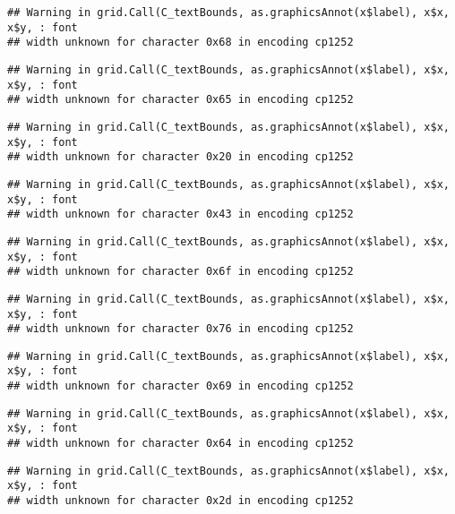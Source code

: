 \documentclass[
]{article}
\begin{document}
\begin{verbatim}
## Warning in grid.Call(C_textBounds, as.graphicsAnnot(x$label), x$x, x$y, : font
## width unknown for character 0x68 in encoding cp1252
\end{verbatim}

\begin{verbatim}
## Warning in grid.Call(C_textBounds, as.graphicsAnnot(x$label), x$x, x$y, : font
## width unknown for character 0x65 in encoding cp1252
\end{verbatim}

\begin{verbatim}
## Warning in grid.Call(C_textBounds, as.graphicsAnnot(x$label), x$x, x$y, : font
## width unknown for character 0x20 in encoding cp1252
\end{verbatim}

\begin{verbatim}
## Warning in grid.Call(C_textBounds, as.graphicsAnnot(x$label), x$x, x$y, : font
## width unknown for character 0x43 in encoding cp1252
\end{verbatim}

\begin{verbatim}
## Warning in grid.Call(C_textBounds, as.graphicsAnnot(x$label), x$x, x$y, : font
## width unknown for character 0x6f in encoding cp1252
\end{verbatim}

\begin{verbatim}
## Warning in grid.Call(C_textBounds, as.graphicsAnnot(x$label), x$x, x$y, : font
## width unknown for character 0x76 in encoding cp1252
\end{verbatim}

\begin{verbatim}
## Warning in grid.Call(C_textBounds, as.graphicsAnnot(x$label), x$x, x$y, : font
## width unknown for character 0x69 in encoding cp1252
\end{verbatim}

\begin{verbatim}
## Warning in grid.Call(C_textBounds, as.graphicsAnnot(x$label), x$x, x$y, : font
## width unknown for character 0x64 in encoding cp1252
\end{verbatim}

\begin{verbatim}
## Warning in grid.Call(C_textBounds, as.graphicsAnnot(x$label), x$x, x$y, : font
## width unknown for character 0x2d in encoding cp1252
\end{verbatim}
\end{document}
